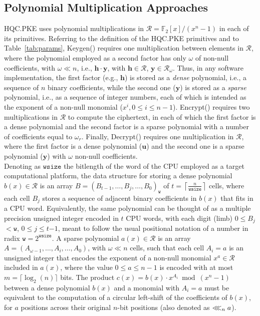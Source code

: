 \subsection{Polynomial Multiplication Approaches}
HQC.PKE uses polynomial multiplications in $\mathcal{R}=\mathbb{F}_2[x] / (x^n-1)$
in each of its primitives. Referring to the definition of the HQC.PKE 
primitives and to Table~\ref{tab:params}, \textsf{Keygen()} requires one 
multiplication between elements in $\mathcal{R}$, where the polynomial 
employed as a second factor has only $\omega$ of non-null coefficients, 
with $\omega \ll n$, i.e., $\mathbf{h} \cdot \mathbf{y}$, with 
$\mathbf{h} \in \mathcal{R}$, $\mathbf{y} \in \mathcal{R}_{\omega}$. 
Thus, in any software implementation, the first factor (e.g., $\mathbf{h}$) 
is stored as a {\em dense} polynomial, i.e., a sequence of $n$ binary 
coefficients, while the second one ($\mathbf{y}$) is stored as a {\em sparse} 
polynomial, i.e., as a sequence of integer numbers, each of which is intended 
as the exponent of a non-null monomial ($x^i, 0 \leq i \leq n-1$). 
\textsf{Encrypt()} requires two multiplications in $\mathcal{R}$ to compute the 
ciphertext, in each of which the first factor is a dense polynomial and the 
second factor is a sparse polynomial with a number of coefficients equal to 
$\omega_r$. 
Finally, \textsf{Decrypt()} requires one multiplication in $\mathcal{R}$, where 
the first factor is a dense polynomial ($\mathbf{u}$) and the second one is a 
sparse polynomial ($\mathbf{y}$) with $\omega$ non-null coefficients.\\ 
Denoting as $\mathtt{wsize}$ the bitlength of the word of the CPU employed as a 
target computational platform, the data structure for storing a dense polynomial 
$b(x) \in \mathcal{R}$ is an array $B = (B_{t-1}, \ldots, B_j, \ldots, B_0)_{\mathtt{w}}$ of $t = \left\lceil \frac{n}{\mathtt{wsize}} \right\rceil$ cells, where each cell 
$B_j$ stores a sequence of adjacent binary coefficients in $b(x)$ that fits in 
a CPU word. Equivalently, the same polynomial can be thought of as a 
multiple precision unsigned integer encoded in $t$ CPU words, with each digit 
(limb) $0$$\leq$$B_j$$<$$\mathtt{w}$, $0$$\leq$$j$$\leq$$t$$-$$1$, meant to 
follow the usual positional notation of a number in radix 
$\mathtt{w} = 2^{\mathtt{wsize}}$.
A sparse polynomial $a(x) \in \mathcal{R}$ is an array $A = (A_{\omega-1}, \ldots, A_i, \ldots, A_{0})$, with $\omega \ll n$ cells, such that each cell $A_i=a$ is an 
unsigned integer that encodes the exponent of a non-null monomial 
$x^a \in \mathcal{R}$ included in $a(x)$, where the value $0\leq a\leq n-1$ is 
encoded with at most $m=\lceil \log_2(n)\rceil$ bits. 
The product $c(x) = b(x) \cdot x^{A_i} \bmod (x^n-1)$ between a dense polynomial 
$b(x)$ and a monomial with $A_i = a$  must be equivalent to the computation of 
a circular left-shift of the coefficients of $b(x)$, for $a$ positions across 
their original $n$-bit positions (also denoted as $\lll_n a$). 

